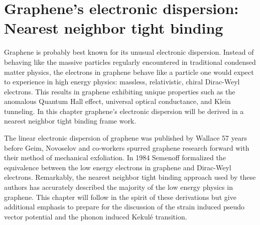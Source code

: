 \chapter{Graphene's electronic dispersion: Nearest neighbor tight binding\label{chap:TightBinding}}

Graphene is probably best known for its unusual electronic dispersion\cite{CastroNeto2009}.  Instead of behaving like the massive particles regularly encountered in traditional condensed matter physics, the electrons in graphene behave like a particle one would expect to experience in high energy physics: massless, relativistic, chiral Dirac-Weyl electrons\cite{Wallace1947,Semenoff1984}.  This results in graphene exhibiting unique properties such as the anomalous Quantum Hall effect\cite{Zhang2005,Novoselov2005a}, universal optical conductance\cite{Nair2008,Mak2008}, and Klein tunneling\cite{Beenakker2008,Young2009}.  In this chapter graphene's electronic dispersion will be derived in a nearest neighbor tight binding frame work.

The linear electronic dispersion of graphene was published by Wallace\cite{Wallace1947} 57 years before Geim, Novoselov and co-workers spurred graphene research forward with their method of mechanical exfoliation\cite{Novoselov2004}.  In 1984 Semenoff formalized the equivalence between the low energy electrons in graphene and Dirac-Weyl electrons.  Remarkably, the nearest neighbor tight binding approach used by these authors has accurately described the majority of the low energy physics in graphene.  This chapter will follow in the spirit of these derivations but give additional emphasis to prepare for the discussion of the strain induced pseudo vector potential and the phonon induced Kekul\'e transition.

